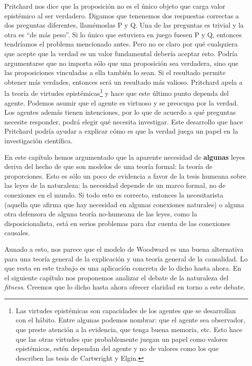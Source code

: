 Pritchard nos dice que la proposición no es el único objeto que carga valor epistémico al ser verdadero. Digamos que tenenemos dos respuestas correctas a dos preguntas diferentes, llamémoslas P y Q. Una de las preguntas es trivial y la otra es ``de más peso''. Si lo único que estuviera en juego fuesen P y Q, entonces tendríamos el problema mencionado antes. Pero no es claro por qué cualquiera que acepte que la verdad es un valor fundamental debería aceptar esto. Podría argumentarse que no importa sólo que una proposición sea verdadera, sino que las proposiciones vinculadas a ella también lo sean. Si el resultado permite obtener más verdades, entonces será un resultado más valioso. Pritchard apela a la teoría de virtudes epistémicas\footnote{Las virtudes epistémicas son capacidades de los agentes que se desarrollan con el hábito. Entre algunas podemos nombrar: que el agente sea observador, que preste atención a la evidencia, que tenga buena memoria, etc. Esto hace que las otras virtudes que probablemente juegan un papel como valores epistémicos, estén dependan del agente y no de valores como los que describen las tesis de Cartwright y Elgin.} y hace que este último punto dependa del agente. Podemos asumir que el agente es virtuoso y se preocupa por la verdad. Los agentes además tienen intenciones, por lo que de acuerdo a qué preguntas necesite responder, podrá elegir qué necesita investigar. Este desarrollo que hace Pritchard podría ayudar a explicar cómo es que la verdad juega un papel en la investigación científica.

En este capítulo hemos argumentado que la aparente necesidad de \textbf{algunas} leyes deriva del hecho de que son modelos de una teoría formal: la teoría de proporciones. Esto es sólo un poco de evidencia a favor de la tesis humeana sobre las leyes de la naturaleza: la necesidad depende de un marco formal, no de conexiones en el mundo. Si todo esto es correcto, entonces la necesitarista (aquella que afirma que hay necesidad en algunas conexiones naturales) o alguna otra defensora de alguna teoría no-humeana de las leyes, como la disposicionalista, está en serios problemas para dar cuenta de las conexiones causales.

Aunado a esto, nos parece que el modelo de Woodward es una buena alternativa para una teoría general de la explicación y una teoría general de la causalidad. Lo que resta en este trabajo es una aplicación concreta de lo dicho hasta ahora. En el siguiente capítulo nos proponemos analizar el debate de la naturaleza del \emph{fitness}. Creemos que lo dicho hasta ahora ofrecer claridad en torno a este debate.

